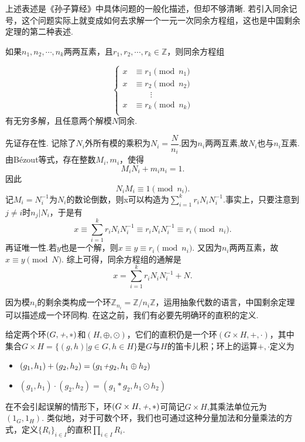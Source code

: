 \documentclass[color=green,mathpazo,titlestyle=hang]{elegantbook}
\begin{document}
  上述表述是《孙子算经》中具体问题的一般化描述，但却不够清晰. 若引入同余记号，这个问题实际上就变成如何去求解一个一元一次同余方程组，这也是中国剩余定理的第二种表述.
  
  \begin{newthem}[中国剩余定理II]
  	如果$n_1,n_2,\cdots,n_k$两两互素，且$r_1,r_2,\cdots,r_k \in \mathbb{Z}$，则同余方程组
  
  	\begin{equation*}
  	\left\{                          
  	\begin{aligned}
  	x&\equiv r_1\pmod{n_1}\\
  	x&\equiv r_2\pmod{n_2}\\
  	 &\qquad \vdots\\ 
  	x&\equiv r_k\pmod{n_k}\\
  	\end{aligned}
  	\right.
  	\end{equation*}
  有无穷多解，且任意两个解模$N$同余.	
  
  \end{newthem}


  \begin{newproof}
	先证存在性. 记除了$N_i$外所有模的乘积为$N_i=\dfrac{N}{n_i}$.因为$n_i$两两互素,故$N_i$也与$n_i$互素.由B\'{e}zout等式，存在整数$M_i,m_i$，使得
	\[
	M_iN_i+m_in_i=1.
	\]
	因此
	\[
	N_iM_i\equiv 1\pmod{n_i}.
	\]
	记$M_i=N_i^{-1}$为$N_i$的数论倒数，则x可以构造为$\sum\limits_{i=1}^{k}r_iN_i N_i^{-1}$.事实上，只要注意到$j\ne i$时$n_j|N_i$，于是有
	\[
	x\equiv \sum_{i=1}^{k}r_iN_i N_i^{-1}\equiv r_iN_i N_i^{-1}\equiv r_i\pmod{n_i}.
	\]
	再证唯一性.若$y$也是一个解，则$x\equiv y\equiv r_i\pmod{n_i}$. 又因为$n_i$两两互素，故$x\equiv y\pmod{N}$.
	综上可得，同余方程组的通解是
	\[
		x=\sum_{i=1}^{k}r_iN_i N_i^{-1}+N.
	\]
  \end{newproof}


  因为模$n_i$的剩余类构成一个环$\mathbb{Z}_{n_i}=\mathbb{Z}/n_i\mathbb{Z}$，运用抽象代数的语言，中国剩余定理可以描述成一个环同构. 在这之前，我们有必要先明确环的直积的定义.

  \newpage

\begin{newdef}[环的直积]
	给定两个环$(G,\emph{+},\ast)$和$(H,\oplus,\odot)$，它们的直积仍是一个环$(G\times H,+,\cdot)$，其中集合$G\times H=\{(g,h)|g\in G, h\in H\}$是$G$与$H$的笛卡儿积；环上的运算$+,\cdot$定义为
	\begin{itemize}
		\parskip=0pt \itemsep=0pt
		\item $(g_1,h_1)+(g_2,h_2)=(g_1\emph{+}g_2,h_1\oplus h_2)$
		\item $(g_1,h_1)\cdot(g_2,h_2)=(g_1\ast g_2,h_1\odot h_2)$
	\end{itemize}
	在不会引起误解的情形下，环$(G\times H,\emph{+},\ast)$可简记$G\times H$,其乘法单位元为$(1_G,1_H)$. 类似地，对于可数个环，我们也可通过这种分量加法和分量乘法的方式，定义$\{R_i\}_{i\in I}$的直积$\prod\limits_{i\in I}R_i$.
\end{newdef}
\end{document}
